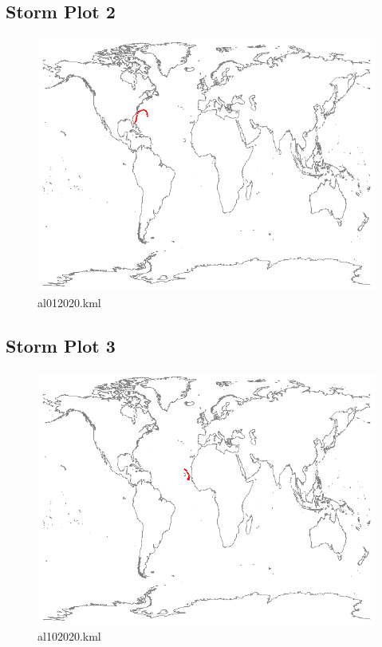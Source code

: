 \documentclass[]{article}
\begin{document}
\clearpage
\subsection{Storm Plot 2}

\begin{figure}[htbp]
    \centering
\includegraphics{al012020.png}
\caption{al012020.kml}
\label{fig:al012020}
\end{figure}

\clearpage
\subsection{Storm Plot 3}

\begin{figure}[htbp]
    \centering
\includegraphics{al102020.png}
\caption{al102020.kml}
\label{fig:al102020}
\end{figure}
\clearpage
\end{document}
